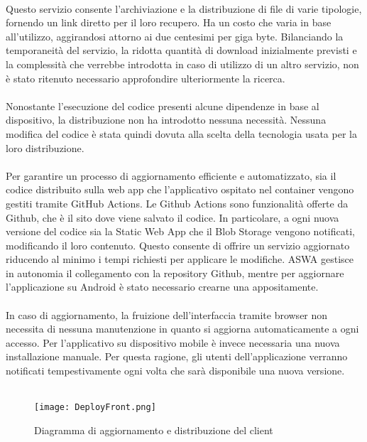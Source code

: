 \\
Questo servizio consente l'archiviazione e la distribuzione di file di varie tipologie,
fornendo un link diretto per il loro recupero.
Ha un costo che varia in base all'utilizzo,
aggirandosi attorno ai due centesimi per giga byte.
Bilanciando la temporaneità del servizio,
la ridotta quantità di download inizialmente previsti e
la complessità che verrebbe introdotta in caso di utilizzo di un altro servizio,
non è stato ritenuto necessario approfondire ulteriormente la ricerca.\\
\\
Nonostante l'esecuzione del codice presenti alcune dipendenze in base al dispositivo,
la distribuzione non ha introdotto nessuna necessità.
Nessuna modifica del codice è stata quindi dovuta alla scelta della tecnologia usata per
la loro distribuzione.\\
\\
Per garantire un processo di aggiornamento efficiente e automatizzato,
sia il codice distribuito sulla web app che l'applicativo ospitato nel container
vengono gestiti tramite GitHub Actions.
Le Github Actions sono funzionalità offerte da Github,
che è il sito dove viene salvato il codice.
In particolare,
a ogni nuova versione del codice
sia la Static Web App che il Blob Storage vengono notificati,
modificando il loro contenuto.
Questo consente di offrire un servizio aggiornato
riducendo al minimo i tempi richiesti per applicare le modifiche.
ASWA gestisce in autonomia il collegamento con la repository Github,
mentre per aggiornare l'applicazione su Android è stato necessario crearne una appositamente.\\
\\
In caso di aggiornamento,
la fruizione dell'interfaccia tramite browser non necessita di nessuna manutenzione
in quanto si aggiorna automaticamente a ogni accesso.
Per l'applicativo su dispositivo mobile è invece necessaria una nuova installazione manuale.
Per questa ragione, gli utenti dell'applicazione verranno notificati tempestivamente
ogni volta che sarà disponibile una nuova versione.\\
\\

\begin{figure}[htbp]
    \begin{center}
        \texttt{[image: DeployFront.png]}
        \caption{Diagramma di aggiornamento e distribuzione del client}
    \end{center}
\end{figure}
\clearpage
